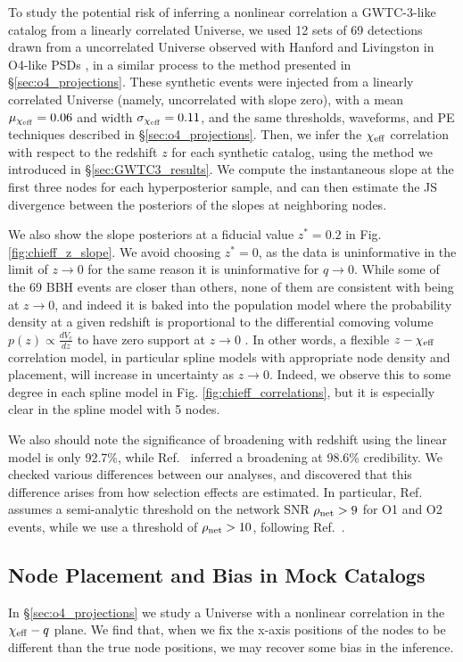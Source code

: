 \documentclass[%
 reprint,
 amsmath,amssymb,
 aps,
 prd,
]{revtex4-2}
\newcommand{\chieff}{\chi_{\rm eff}}
\begin{document}
To study the potential risk of inferring a nonlinear correlation a \ac{GWTC-3}-like catalog from a linearly correlated Universe, we used 12 sets of 69 detections drawn from a uncorrelated Universe observed with Hanford and Livingston in O4-like PSDs \cite{O3_psds}, in a similar process to the method presented in \S \ref{sec:o4_projections}. These synthetic events were injected from a linearly correlated Universe (namely, uncorrelated with slope zero), with a mean $\mu_{\chieff} = 0.06$ and width $\sigma_{\chieff} = 0.11$, and the same thresholds, waveforms, and PE techniques described in \S \ref{sec:o4_projections}. Then, we infer the $\chieff$ correlation with respect to the redshift $z$ for each synthetic catalog, using the method we introduced in \S \ref{sec:GWTC3_results}. We compute the instantaneous slope at the first three nodes for each hyperposterior sample, and can then estimate the \ac{JS} divergence between the posteriors of the slopes at neighboring nodes. 

We also show the slope posteriors at a fiducial value $z^*=0.2$ in Fig. \ref{fig:chieff_z_slope}. We avoid choosing $z^*=0$, as the data is uninformative in the limit of $z\to 0$ for the same reason it is uninformative for $q\to 0$. While some of the 69 BBH events are closer than others, none of them are consistent with being at $z\to 0$, and indeed it is baked into the population model where the probability density at a given redshift is proportional to the differential comoving volume $p(z) \propto \frac{dV_c}{dz}$ to have zero support at $z\to 0$ \cite{Hogg:1999ad, Fishbach:2018edt}. In other words, a flexible $z-\chieff$ correlation model, in particular spline models with appropriate node density and placement, will increase in uncertainty as $z\to 0$. Indeed, we observe this to some degree in each spline model in Fig. \ref{fig:chieff_correlations}, but it is especially clear in the spline model with 5 nodes. 

We also should note the significance of broadening with redshift using the linear model is only 92.7\%, while Ref.~\cite{Biscoveanu:2022qac} inferred a broadening at 98.6\% credibility. We checked various differences between our analyses, and discovered that this difference arises from how selection effects are estimated. In particular, Ref.~\cite{Biscoveanu:2022qac} assumes a semi-analytic threshold on the network SNR $\rho_{\rm net} > 9$ for O1 and O2 events, while we use a threshold of $\rho_{\rm net} > 10$, following Ref.~\cite{KAGRA:2021duu}.

\subsection{Node Placement and Bias in Mock Catalogs}
\label{app:node_placement_bias}
In \S \ref{sec:o4_projections} we study a Universe with a nonlinear correlation in the $\chieff-q$ plane. We find that, when we fix the x-axis positions of the nodes to be different than the true node positions, we may recover some bias in the inference.
\end{document}
